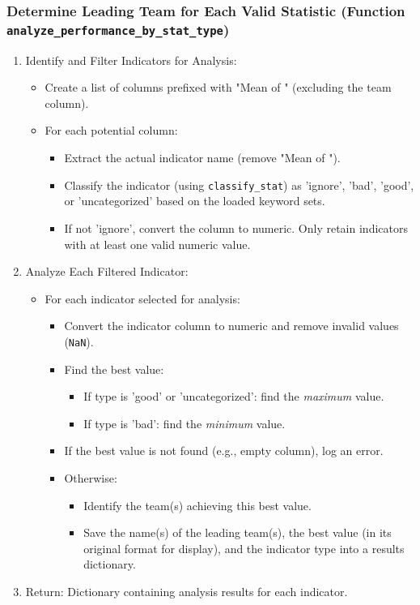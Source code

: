 \documentclass[12pt, a4paper]{report}
\begin{document}
\subsubsection*{Determine Leading Team for Each Valid Statistic \sloppypar (Function \texttt{analyze\_performance\_by\_stat\_type})}
\begin{enumerate}[label*=\textbf{Step \arabic*:}, leftmargin=*]
    \item Identify and Filter Indicators for Analysis:
    \begin{itemize}[leftmargin=0em]
        \item Create a list of columns prefixed with "Mean of " (excluding the team column).
        \item For each potential column:
        \begin{itemize}
            \item Extract the actual indicator name (remove "Mean of ").
            \item Classify the indicator (using \texttt{classify\_stat}) as 'ignore', 'bad', 'good', or 'uncategorized' based on the loaded keyword sets.
            \item If not 'ignore', convert the column to numeric. Only retain indicators with at least one valid numeric value.
        \end{itemize}
    \end{itemize}
    \item Analyze Each Filtered Indicator:
    \begin{itemize}[leftmargin=0em]
        \item For each indicator selected for analysis:
        \begin{itemize}
            \item Convert the indicator column to numeric and remove invalid values (\texttt{NaN}).
            \item Find the best value:
            \begin{itemize}
                \item If type is 'good' or 'uncategorized': find the \textit{maximum} value.
                \item If type is 'bad': find the \textit{minimum} value.
            \end{itemize}
            \item If the best value is not found (e.g., empty column), log an error.
            \item Otherwise:
            \begin{itemize}
                \item Identify the team(s) achieving this best value.
                \item Save the name(s) of the leading team(s), the best value (in its original format for display), and the indicator type into a results dictionary.
            \end{itemize}
        \end{itemize}
    \end{itemize}
    \item Return: Dictionary containing analysis results for each indicator.
\end{enumerate}
\end{document}
